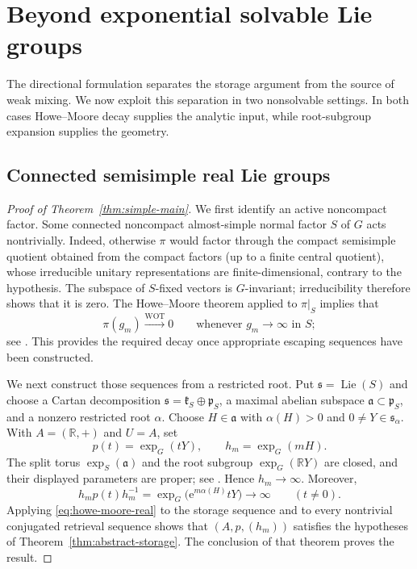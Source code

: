 \documentclass[10pt,a4paper]{amsart}
\numberwithin{equation}{section}
\newcommand{\R}{\mathbb R}
\newcommand{\e}{\mathrm e}
\begin{document}
\section{Beyond exponential solvable Lie groups}
\label{sec:beyond-exponential}

The directional formulation separates the storage argument from the source
of weak mixing.  We now exploit this separation in two nonsolvable settings.
In both cases Howe--Moore decay supplies the analytic input, while
root-subgroup expansion supplies the geometry.

\subsection{Connected semisimple real Lie groups}

\begin{proof}[Proof of Theorem~\ref{thm:simple-main}]
We first identify an active noncompact factor.  Some connected noncompact
almost-simple normal factor $S$ of $G$ acts
nontrivially.  Indeed, otherwise $\pi$ would factor through the compact
semisimple quotient obtained from the compact factors (up to a finite central
quotient), whose irreducible unitary representations are finite-dimensional,
contrary to the hypothesis.  The subspace of $S$-fixed vectors
is $G$-invariant; irreducibility therefore shows that it is zero.  The
Howe--Moore theorem applied to $\pi|_S$ implies that
\begin{equation}\label{eq:howe-moore-real}
 \pi(g_m)\xrightarrow{\mathrm{WOT}}0
 \qquad\text{whenever }g_m\longrightarrow\infty\text{ in }S;
\end{equation}
see \cite{HoweMoore1979}.  This provides the required decay once appropriate
escaping sequences have been constructed.

We next construct those sequences from a restricted root.  Put
$\mathfrak s=\operatorname{Lie}(S)$ and choose a Cartan decomposition
$\mathfrak s=\mathfrak k_S\oplus\mathfrak p_S$, a maximal abelian subspace
$\mathfrak a\subset\mathfrak p_S$, and a nonzero
restricted root $\alpha$.  Choose $H\in\mathfrak a$ with $\alpha(H)>0$ and
$0\neq Y\in\mathfrak s_\alpha$.  With $A=(\R,+)$ and $U=A$, set
\[
 p(t)=\exp_G(tY),\qquad h_m=\exp_G(mH).
\]
The split torus $\exp_S(\mathfrak a)$ and the root subgroup
$\exp_G(\R Y)$ are closed, and their displayed parameters are proper; see
\cite[Chapter~VI]{Knapp2002}.  Hence $h_m\to\infty$.  Moreover,
\begin{equation}\label{eq:restricted-root-expansion}
 h_mp(t)h_m^{-1}
 =\exp_G\bigl(\e^{m\alpha(H)}tY\bigr)\longrightarrow\infty
 \qquad(t\neq0).
\end{equation}
Applying \eqref{eq:howe-moore-real} to the storage sequence and to every
nontrivial conjugated retrieval sequence shows that
$(A,p,(h_m))$ satisfies the hypotheses of
Theorem~\ref{thm:abstract-storage}.  The conclusion of that theorem proves
the result.
\end{proof}
\end{document}
